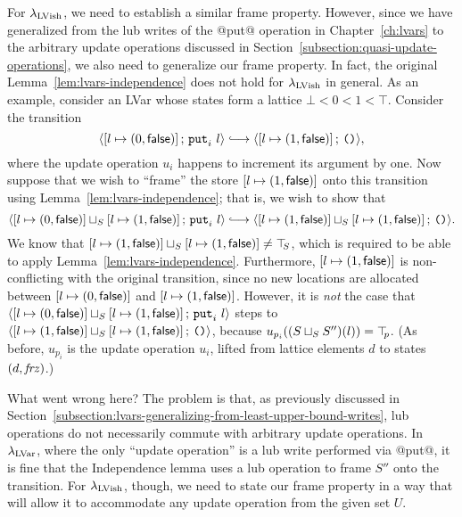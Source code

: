 For $\lambda_{\textrm{LVish}}$, we need to establish a similar frame property.
However, since we have generalized from the lub writes of the @put@
operation in Chapter~\ref{ch:lvars} to the arbitrary update operations
discussed in Section~\ref{subsection:quasi-update-operations}, we also
need to generalize our frame property.  In fact, the original
Lemma~\ref{lem:lvars-independence} does not hold for $\lambda_{\textrm{LVish}}$ in
general.  As an example, consider an LVar whose states form a lattice
$\bot < 0 < 1 < \top$.  Consider the transition
\[
\config{\store{\storebinding{l}{0}{\frozenfalse}}}{\putiexp{l}}
\parstepsto \config{\store{\storebinding{l}{1}{\frozenfalse}}}{\unit},
\]
where the update operation $u_i$ happens to increment its argument by
one.  Now suppose that we wish to ``frame'' the store
$\left[ l \mapsto (1, \textsf{false}) \right]$ onto this transition using
Lemma~\ref{lem:lvars-independence}; that is, we wish to show that
\[
\config{\lubstore{\store{\storebinding{l}{0}{\frozenfalse}}}{\store{\storebinding{l}{1}{\frozenfalse}}}}{\putiexp{l}}
\parstepsto
\config{\lubstore{\store{\storebinding{l}{1}{\frozenfalse}}}{\store{\storebinding{l}{1}{\frozenfalse}}}}{\unit}.
\]
We know that
$\left[ l \mapsto (1, \textsf{false}) \right] \sqcup_{S} \left[ l \mapsto (1, \textsf{false}) \right]
\neq \top\hspace{-0.85mm}_{S}$, which is required to be able to apply
Lemma~\ref{lem:lvars-independence}.  Furthermore,
$\left[ l \mapsto (1, \textsf{false}) \right]$ is non-conflicting with
the original transition, since no new locations are allocated between
$\left[ l \mapsto (0, \textsf{false}) \right]$ and
$\left[ l \mapsto (1, \textsf{false}) \right]$.  However, it is
\emph{not} the case that
$\langle \left[ l \mapsto (0, \textsf{false}) \right] \sqcup_{S} \left[ l \mapsto (1, \textsf{false}) \right];\, \mbox{\texttt{put}}_i~l \rangle$
steps to
$\langle \left[ l \mapsto (1, \textsf{false}) \right] \sqcup_{S} \left[ l \mapsto (1, \textsf{false}) \right];\, \mbox{\texttt{()}} \rangle$,
because $u_{p_i}((S \sqcup_{S} S'')(l)) = \top\hspace{-0.85mm}_{p}$.  (As before,
$u_{p_i}$ is the update operation $u_i$, lifted from lattice elements
$d$ to states $(d, \mathit{frz})$.)

What went wrong here?  The problem is that, as previously discussed in
Section~\ref{subsection:lvars-generalizing-from-least-upper-bound-writes},
lub operations do not necessarily commute with arbitrary update
operations.  In $\lambda_{\textrm{LVar}}$, where the only ``update operation'' is
a lub write performed via @put@, it is fine that the Independence
lemma uses a lub operation to frame $S''$ onto the transition. For
$\lambda_{\textrm{LVish}}$, though, we need to state our frame property in a way
that will allow it to accommodate any update operation from the given
set $U$.

